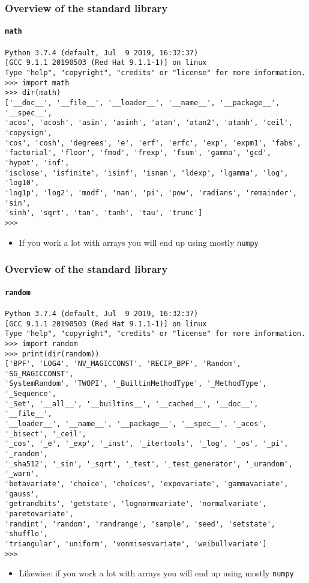 \documentclass[9pt]{beamer}
\begin{document}
\begin{frame}[fragile]
  \frametitle{Overview of the standard library}
  \framesubtitle{\texttt{math}}
  \begin{Verbatim}
Python 3.7.4 (default, Jul  9 2019, 16:32:37) 
[GCC 9.1.1 20190503 (Red Hat 9.1.1-1)] on linux
Type "help", "copyright", "credits" or "license" for more information.
>>> import math
>>> dir(math)
['__doc__', '__file__', '__loader__', '__name__', '__package__', '__spec__',
'acos', 'acosh', 'asin', 'asinh', 'atan', 'atan2', 'atanh', 'ceil', 'copysign',
'cos', 'cosh', 'degrees', 'e', 'erf', 'erfc', 'exp', 'expm1', 'fabs',
'factorial', 'floor', 'fmod', 'frexp', 'fsum', 'gamma', 'gcd', 'hypot', 'inf',
'isclose', 'isfinite', 'isinf', 'isnan', 'ldexp', 'lgamma', 'log', 'log10',
'log1p', 'log2', 'modf', 'nan', 'pi', 'pow', 'radians', 'remainder', 'sin',
'sinh', 'sqrt', 'tan', 'tanh', 'tau', 'trunc']
>>>
  \end{Verbatim}

  \medskip

  \begin{itemize}
  \item If you work a lot with arrays you will end up using mostly
    \texttt{numpy}
  \end{itemize}
\end{frame}


\begin{frame}[fragile]
  \frametitle{Overview of the standard library}
  \framesubtitle{\texttt{random}}
  \begin{Verbatim}
Python 3.7.4 (default, Jul  9 2019, 16:32:37) 
[GCC 9.1.1 20190503 (Red Hat 9.1.1-1)] on linux
Type "help", "copyright", "credits" or "license" for more information.
>>> import random
>>> print(dir(random))
['BPF', 'LOG4', 'NV_MAGICCONST', 'RECIP_BPF', 'Random', 'SG_MAGICCONST',
'SystemRandom', 'TWOPI', '_BuiltinMethodType', '_MethodType', '_Sequence',
'_Set', '__all__', '__builtins__', '__cached__', '__doc__', '__file__',
'__loader__', '__name__', '__package__', '__spec__', '_acos', '_bisect', '_ceil',
'_cos', '_e', '_exp', '_inst', '_itertools', '_log', '_os', '_pi', '_random',
'_sha512', '_sin', '_sqrt', '_test', '_test_generator', '_urandom', '_warn',
'betavariate', 'choice', 'choices', 'expovariate', 'gammavariate', 'gauss',
'getrandbits', 'getstate', 'lognormvariate', 'normalvariate', 'paretovariate',
'randint', 'random', 'randrange', 'sample', 'seed', 'setstate', 'shuffle',
'triangular', 'uniform', 'vonmisesvariate', 'weibullvariate']
>>>     
  \end{Verbatim}

  \medskip
  
  \begin{itemize}
  \item Likewise: if you work a lot with arrays you will end up using mostly
    \texttt{numpy}
  \end{itemize}
\end{frame}
\end{document}
